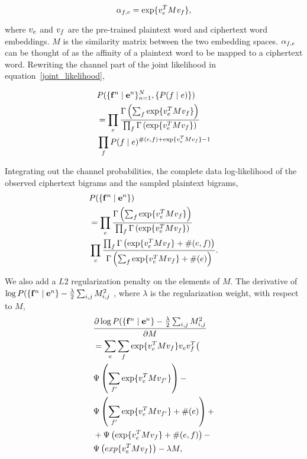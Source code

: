 \begin{equation}
\alpha_{f,e} = \exp \{ v_{e}^T  M  v_{f} \},
\end{equation}

where $v_{e}$ and $v_{f}$ are the pre-trained plaintext word and ciphertext word embeddings.  $M$ is the similarity matrix between the two embedding spaces. $\alpha_{f,e}$ can be thought of as the affinity of a plaintext word to be mapped to a ciphertext word. Rewriting the channel part of the joint likelihood in equation~\ref{joint_likelihood}, 

\begin{align*}
&P( \{ \mathbf{f}^n \mid \mathbf{e}^n \}_{n=1}^{N}, \{ P(f \mid e) \})  \\
&=\prod_{e}  \frac{\Gamma \left( \sum_{f} \exp \{ v_{e}^T  M  v_{f} \}  \right)} {\prod_{f} \Gamma \left( \exp \{ v_{e}^T  M  v_{f} \} \right)} \\
& \prod_{f} P(f \mid e)^{\#(e,f)+ \exp \{ v_{e}^T  M  v_{f} \} -1} 
\end{align*}

Integrating out the channel probabilities, the complete data log-likelihood of the observed ciphertext bigrams and the sampled plaintext bigrams,
\begin{align*}
&P( \{ \mathbf{f}^n \mid \mathbf{e}^n \}) \\
&= \prod_{e}  \frac{\Gamma \left( \sum_{f} \exp \{ v_{e}^T  M  v_{f} \}  \right)} {\prod_{f} \Gamma \left( \exp \{ v_{e}^T  M  v_{f} \} \right)} \\
& \prod_{e}  \frac{\prod_{f} \Gamma \left( \exp \{ v_{e}^T  M  v_{f} \} + \#(e,f) \right)} {\Gamma \left( \sum_{f} \exp \{ v_{e}^T  M  v_{f} \} + \#(e) \right)}.
\end{align*}

We also add a $L2$ regularization penalty on the elements of $M$. The derivative of $\log P( \{ \mathbf{f}^n \mid \mathbf{e}^n \} - \frac{\lambda}{2} \sum_{i,j} M_{i,j}^2$ , where $\lambda$ is the regularization weight, with respect to $M$,
\begin{align*}
&\frac {\partial \log P( \{ \mathbf{f}^n \mid \mathbf{e}^n \} - \frac{\lambda}{2} \sum_{i,j} M_{i,j}^2 }{\partial M}  \\
& = \sum_{e}  \sum_{f} \exp \{ v_{e}^T  M  v_{f}\}  v_{e} v_{f}^T \bigl( \\
& \Psi \left( \sum_{f'} \exp \{ v_{e}^ T M  v_{f'} \} \right) - \\
& \Psi \left( \sum_{f'} \exp \{ v_{e}^T  M  v_{f'} \} + \#(e) \right)  + \\
& + \Psi \left( \exp \{ v_{e}^T  M  v_{f} \} + \#(e,f) \right) - \\
& \Psi \left( exp \{ v_{e}^T  M  v_{f} \} \right) - \lambda  M, 
\end{align*}

